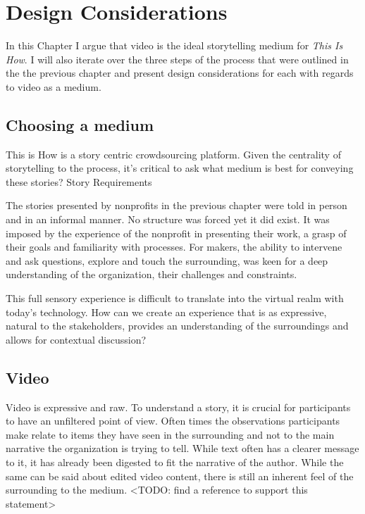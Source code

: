 \chapter{Design Considerations}
\label{chap_design_consider}

In this Chapter I argue that video is the ideal storytelling medium for \textit{This Is How}. I will also iterate over the three steps of the process that were outlined in the the previous chapter and present design considerations for each with regards to video as a medium. 

\section{Choosing a medium}

This is How is a story centric crowdsourcing platform. Given the centrality of storytelling to the process, it’s critical to ask what medium is best for conveying these stories?
Story Requirements

The stories presented by nonprofits in the previous chapter were told in person and in an informal manner. No structure was forced yet it did exist. It was imposed by the experience of the nonprofit in presenting their work,  a grasp of their goals and familiarity with processes. For makers, the ability to intervene and ask questions, explore and touch the surrounding, was keen for a deep understanding of the organization, their challenges and constraints. 

This full sensory experience is difficult to translate into the virtual realm with today's technology. How can we create an experience that is as expressive, natural to the stakeholders, provides an understanding of the surroundings and allows for contextual discussion?

\section{Video}

Video is expressive and raw. To understand a story, it is crucial for participants to have an unfiltered point of view. Often times the observations participants make relate to items they have seen in the surrounding and not to the main narrative the organization is trying to tell. While text often has a clearer message to it, it has already been digested to fit the narrative of the author. While the same can be said about edited video content, there is still an inherent feel of the surrounding to the medium. <TODO: find a  reference to support this statement>

